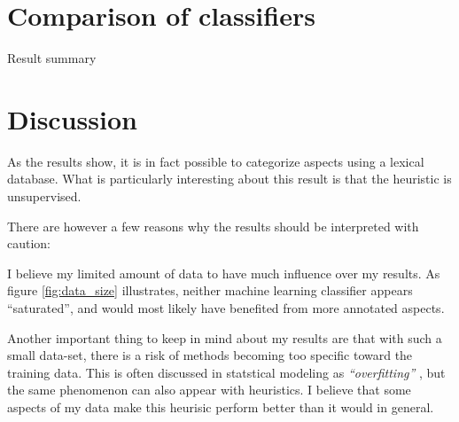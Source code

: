 \documentclass[a4paper,11pt]{kth-mag}
\begin{document}
\section{Comparison of classifiers}
\label{sec:comparison}

\begin{table}[h]
  \centering

  \vspace{0.4cm}\caption{Result summary}
  \label{general_asp}
\end{table}


\section{Discussion}
As the results show, it is in fact possible to categorize aspects using a lexical database. What is particularly interesting about this result is that the heuristic is unsupervised.

There are however a few reasons why the results should be interpreted with caution:

I believe my limited amount of data to have much influence over my results. As figure \ref{fig:data_size} illustrates, neither machine learning classifier appears ``saturated'', and would most likely have benefited from more annotated aspects.

Another important thing to keep in mind about my results are that with such a small data-set, there is a risk of methods becoming too specific toward the training data. This is often discussed in statstical modeling as \emph{``overfitting'' }, but the same phenomenon can also appear with heuristics. I believe that some aspects of my data make this heurisic perform better than it would in general.







\end{document}
